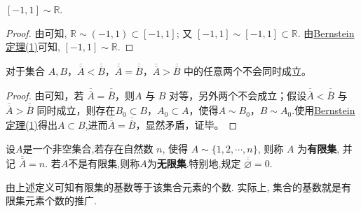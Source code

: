 \documentclass[../../main.tex]{subfiles}
\begin{document}
\begin{example}\label{example:[-1,1]与R对等}
$[-1, 1] \sim \mathbb{R}$.
\end{example}
\begin{proof}
由可知, $\mathbb{R} \sim (-1, 1) \subset [-1, 1]$; 又 $[-1, 1] \sim [-1, 1] \subset \mathbb{R}$. 由\hyperref[theorem:Bernstein定理]{Bernstein定理(1)}可知, $[-1, 1] \sim \mathbb{R}$.
\end{proof}

\begin{theorem}
对于集合 $A, B$，$\overline{\overline{A}} < \overline{\overline{B}}$，$\overline{\overline{A}} = \overline{\overline{B}}$，$\overline{\overline{A}} > \overline{\overline{B}}$ 中的任意两个不会同时成立。
\end{theorem}
\begin{proof}
由可知，若 $\overline{\overline{A}} = \overline{\overline{B}}$，则$A$ 与 $B$ 对等，另外两个不会成立；假设$\overline{\overline{A}} < \overline{\overline{B}}$ 与 $\overline{\overline{A}} > \overline{\overline{B}}$ 同时成立，则存在$B_0 \subset B$，$A_0 \subset A$，使得$A \sim B_0$，$B \sim A_0$.使用\hyperref[theorem:Bernstein定理]{Bernstein定理(1)}得出$A \subset B$,进而$\overline{\overline{A}} = \overline{\overline{B}}$，显然矛盾，证毕。
\end{proof}

\begin{definition}[有限集与无限集]\label{definition:有限集与无限集}
设$A$是一个非空集合,若存在自然数 $n$, 使得 $A \sim \{1, 2, \cdots, n\}$, 则称 $A$ 为\textbf{有限集}, 并记 $\overline{\overline{A}} = n$. 若$A$不是有限集,则称$A$为\textbf{无限集}.特别地,规定 $\overline{\overline{\varnothing}} = 0$.
\end{definition}
\begin{note}
由上述定义可知有限集的基数等于该集合元素的个数. 实际上, 集合的基数就是有限集元素个数的推广.
\end{note}
\end{document}
